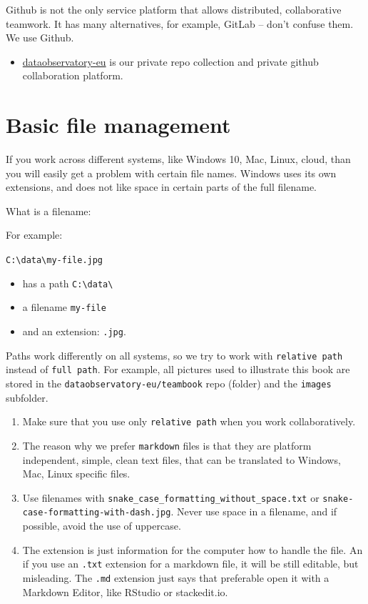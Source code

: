 \documentclass[
  a4paper,
  openany, a4paper, oneside]{book}
\providecommand{\tightlist}{%
  \setlength{\itemsep}{0pt}\setlength{\parskip}{0pt}}
\begin{document}
Github is not the only service platform that allows distributed, collaborative teamwork. It has many alternatives, for example, GitLab -- don't confuse them. We use Github.

\begin{itemize}
\tightlist
\item
  \href{https://github.com/dataobservatory-eu}{dataobservatory-eu} is our private repo collection and private github collaboration platform.
\end{itemize}

\hypertarget{filemanagement}{%
\section{Basic file management}\label{filemanagement}}

If you work across different systems, like Windows 10, Mac, Linux, cloud, than you will easily get a problem with certain file names. Windows uses its own extensions, and does not like space in certain parts of the full filename.

What is a filename:

For example:

\texttt{C:\textbackslash{}data\textbackslash{}my-file.jpg}

\begin{itemize}
\tightlist
\item
  has a path \texttt{C:\textbackslash{}data\textbackslash{}}
\item
  a filename \texttt{my-file}
\item
  and an extension: \texttt{.jpg}.
\end{itemize}

Paths work differently on all systems, so we try to work with \texttt{relative\ path} instead of \texttt{full\ path}. For example, all pictures used to illustrate this book are stored in the \texttt{dataobservatory-eu/teambook} repo (folder) and the \texttt{images} subfolder.

\begin{enumerate}
\def\labelenumi{\arabic{enumi}.}
\item
  Make sure that you use only \texttt{relative\ path} when you work collaboratively.
\item
  The reason why we prefer \texttt{markdown} files is that they are platform independent, simple, clean text files, that can be translated to Windows, Mac, Linux specific files.
\item
  Use filenames with \texttt{snake\_case\_formatting\_without\_space.txt} or \texttt{snake-case-formatting-with-dash.jpg}. Never use space in a filename, and if possible, avoid the use of uppercase.
\item
  The extension is just information for the computer how to handle the file. An if you use an \texttt{.txt} extension for a markdown file, it will be still editable, but misleading. The \texttt{.md} extension just says that preferable open it with a Markdown Editor, like RStudio or stackedit.io.
\end{enumerate}
\end{document}
